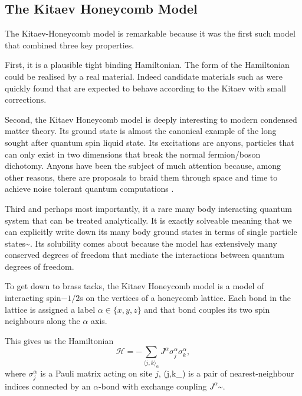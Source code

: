 \hypertarget{the-kitaev-honeycomb-model}{%
\subsection{The Kitaev Honeycomb
Model}\label{the-kitaev-honeycomb-model}}

The Kitaev-Honeycomb model is remarkable because it was the first such
model that combined three key properties.

First, it is a plausible tight binding Hamiltonian. The form of the
Hamiltonian could be realised by a real material. Indeed candidate
materials such as  were quickly found
\cite{banerjeeProximateKitaevQuantum2016, trebstKitaevMaterials2022}
that are expected to behave according to the Kitaev with small
corrections.

Second, the Kitaev Honeycomb model is deeply interesting to modern
condensed matter theory. Its ground state is almost the canonical
example of the long sought after quantum spin liquid state. Its
excitations are anyons, particles that can only exist in two dimensions
that break the normal fermion/boson dichotomy. Anyons have been the
subject of much attention because, among other reasons, there are
proposals to braid them through space and time to achieve noise tolerant
quantum computations \cite{freedmanTopologicalQuantumComputation2003}.

Third and perhaps most importantly, it a rare many body interacting
quantum system that can be treated analytically. It is exactly solveable
meaning that we can explicitly write down its many body ground states in
terms of single particle
states\textasciitilde{}\cite{kitaevAnyonsExactlySolved2006}. Its
solubility comes about because the model has extensively many conserved
degrees of freedom that mediate the interactions between quantum degrees
of freedom.

To get down to brass tacks, the Kitaev Honeycomb model is a model of
interacting spin\(-1/2\)s on the vertices of a honeycomb lattice. Each
bond in the lattice is assigned a label \(\alpha \in \{ x, y, z\}\) and
that bond couples its two spin neighbours along the \(\alpha\) axis.

This gives us the Hamiltonian
\[\mathcal{H} =  - \sum_{\langle j,k\rangle_\alpha} J^{\alpha}\sigma_j^{\alpha}\sigma_k^{\alpha},\]
where \(\sigma^\alpha_j\) is a Pauli matrix acting on site \(j\),
(\langle j,k\rangle\_\alpha) is a pair of nearest-neighbour indices
connected by an \(\alpha\)-bond with exchange coupling
\(J^\alpha\)\textasciitilde{}\cite{kitaevAnyonsExactlySolved2006}.

